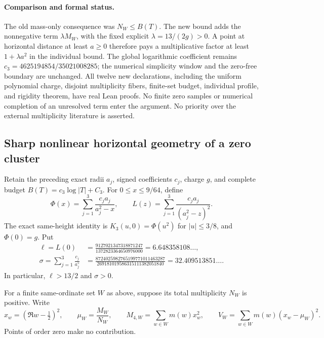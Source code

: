 \paragraph{Comparison and formal status.}
The old mass-only consequence was \(N_W\le B(T)\).  The new bound adds
the nonnegative term \(\lambda M_W\), with the fixed explicit
\(\lambda=13/(2g)>0\).  A point at horizontal distance at least
\(a\ge0\) therefore pays a multiplicative factor at least
\(1+\lambda a^2\) in the individual bound.
The global logarithmic coefficient remains
\(c_3=4625194854/35021008285\); the numerical simplicity window and
the zero-free boundary are unchanged.
All twelve new declarations, including the uniform polynomial charge,
disjoint multiplicity fibers, finite-set budget, individual profile,
and rigidity theorem, have real Lean proofs.  No finite zero samples
or numerical completion of an unresolved term enter the argument.
No priority over the external multiplicity literature is asserted.

\subsection{Sharp nonlinear horizontal geometry of a zero cluster}
\label{sec:nonlinear-horizontal-geometry}

Retain the preceding exact radii \(a_j\), signed coefficients \(c_j\),
charge \(g\), and complete budget \(B(T)=c_3\log|T|+C_3\).
For \(0\le x\le9/64\), define
\[
 \Phi(x)=\sum_{j=1}^3\frac{c_ja_j}{a_j^2-x},\qquad
 L(z)=\sum_{j=1}^3\frac{c_ja_j}{(a_j^2-z)^2}.
\]
The exact same-height identity is \(K_3(u,0)=\Phi(u^2)\) for
\(|u|\le3/8\), and \(\Phi(0)=g\).  Put
\begin{align*}
 \ell=L(0)&=\frac{9127021347318871247}{1372823364650976000}
             =6.648358108\ldots,\\
 \sigma=\sum_{j=1}^3\frac{c_j}{a_j^5}
   &=\frac{8724025982765199771011463287}{269181019586315111382051840}
             =32.409513851\ldots.
\end{align*}
In particular, \(\ell>13/2\) and \(\sigma>0\).

For a finite same-ordinate set \(W\) as above, suppose its total
multiplicity \(N_W\) is positive.  Write
\[
 x_w=(\Re w-\tfrac12)^2,\qquad
 \mu_W=\frac{M_W}{N_W},\qquad
 M_{4,W}=\sum_{w\in W}m(w)x_w^2,\qquad
 V_W=\sum_{w\in W}m(w)(x_w-\mu_W)^2.
\]
Points of order zero make no contribution.


